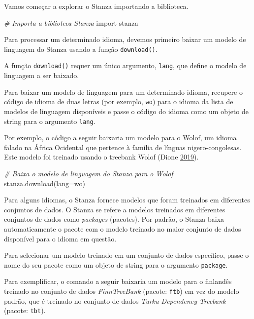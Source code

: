 \documentclass[
  brazilian,
]{article}
\newenvironment{Shaded}{}{}
\newcommand{\CommentTok}[1]{\textcolor[rgb]{0.38,0.63,0.69}{\textit{#1}}}
\newcommand{\ImportTok}[1]{#1}
\newcommand{\NormalTok}[1]{#1}
\newcommand{\OperatorTok}[1]{\textcolor[rgb]{0.40,0.40,0.40}{#1}}
\newcommand{\StringTok}[1]{\textcolor[rgb]{0.25,0.44,0.63}{#1}}
\begin{document}
Vamos começar a explorar o Stanza importando a biblioteca.

\begin{Shaded}
\begin{Highlighting}[]
\CommentTok{\# Importa a biblioteca Stanza}
\ImportTok{import}\NormalTok{ stanza}
\end{Highlighting}
\end{Shaded}

Para processar um determinado idioma, devemos primeiro baixar um modelo
de linguagem do Stanza usando a função \texttt{download()}.

A função \texttt{download()} requer um único argumento, \texttt{lang},
que define o modelo de linguagem a ser baixado.

Para baixar um modelo de linguagem para um determinado idioma, recupere
o código de idioma de duas letras (por exemplo, \texttt{wo}) para o
idioma da lista de modelos de linguagem disponíveis e passe o código do
idioma como um objeto de string para o argumento \texttt{lang}.

Por exemplo, o código a seguir baixaria um modelo para o Wolof, um
idioma falado na África Ocidental que pertence à família de línguas
nigero-congolesas. Este modelo foi treinado usando o treebank Wolof
(Dione \href{https://www.aclweb.org/anthology/W19-8003/}{2019}).

\begin{Shaded}
\begin{Highlighting}[]
\CommentTok{\# Baixa o modelo de linguagem do Stanza para o Wolof}
\NormalTok{stanza.download(lang}\OperatorTok{=}\StringTok{\textquotesingle{}wo\textquotesingle{}}\NormalTok{)}
\end{Highlighting}
\end{Shaded}

Para alguns idiomas, o Stanza fornece modelos que foram treinados em
diferentes conjuntos de dados. O Stanza se refere a modelos treinados em
diferentes conjuntos de dados como \emph{packages} (pacotes). Por
padrão, o Stanza baixa automaticamente o pacote com o modelo treinado no
maior conjunto de dados disponível para o idioma em questão.

Para selecionar um modelo treinado em um conjunto de dados específico,
passe o nome do seu pacote como um objeto de string para o argumento
\texttt{package}.

Para exemplificar, o comando a seguir baixaria um modelo para o
finlandês treinado no conjunto de dados \emph{FinnTreeBank} (pacote:
\texttt{ftb}) em vez do modelo padrão, que é treinado no conjunto de
dados \emph{Turku Dependency Treebank} (pacote: \texttt{tbt}).
\end{document}
